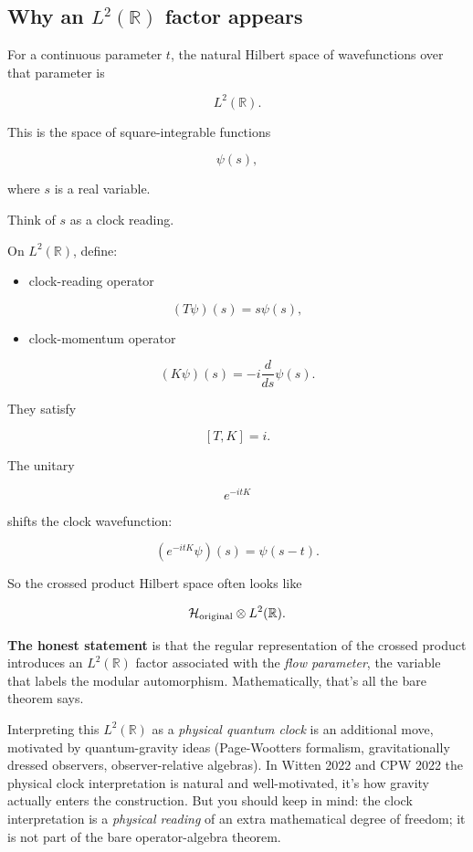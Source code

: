 \documentclass[11pt,a4paper]{article}
\begin{document}
\subsection{Why an $L^2(\mathbb{R})$ factor appears}

For a continuous parameter $t$, the natural Hilbert space of wavefunctions over that parameter is

\[
L^2(\mathbb{R}).
\]

This is the space of square-integrable functions

\[
\psi(s),
\]

where $s$ is a real variable.

Think of $s$ as a clock reading.

On $L^2(\mathbb{R})$, define:

\begin{itemize}
  \item clock-reading operator
\end{itemize}

\[
(T\psi)(s)=s\psi(s),
\]

\begin{itemize}
  \item clock-momentum operator
\end{itemize}

\[
(K\psi)(s)=-i\frac{d}{ds}\psi(s).
\]

They satisfy

\[
[T,K]=i.
\]

The unitary

\[
e^{-itK}
\]

shifts the clock wavefunction:

\[
(e^{-itK}\psi)(s)=\psi(s-t).
\]

So the crossed product Hilbert space often looks like

\[
\mathcal{H}_{\rm original}\otimes L^2(\mathbb{R}).
\]

\textbf{The honest statement} is that the regular representation of the crossed product introduces an $L^2(\mathbb{R})$ factor associated with the \emph{flow parameter}, the variable that labels the modular automorphism. Mathematically, that's all the bare theorem says.

Interpreting this $L^2(\mathbb{R})$ as a \emph{physical quantum clock} is an additional move, motivated by quantum-gravity ideas (Page-Wootters formalism, gravitationally dressed observers, observer-relative algebras). In Witten 2022 and CPW 2022 the physical clock interpretation is natural and well-motivated, it's how gravity actually enters the construction. But you should keep in mind: the clock interpretation is a \emph{physical reading} of an extra mathematical degree of freedom; it is not part of the bare operator-algebra theorem.
\end{document}
